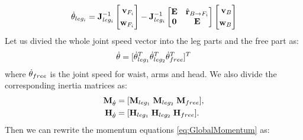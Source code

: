 \begin{equation}
\dot{\bf \theta}_{leg_i} = {\bf J}^{-1}_{leg_i}
\left[
\begin{aligned}
{\bf v}_{F_i} \\
{\bf w}_{F_i} \\
\end{aligned}
\right]
-
{\bf J}^{-1}_{leg_i}
\left[
\begin{matrix}
{\bf E} & \hat{\bf r}_{B \rightarrow F_i} \\
{\bf 0} & {\bf E}\\
\end{matrix}
\right]
\left[
\begin{aligned}
{\bf v}_{B} \\
{\bf w}_{B} \\
\end{aligned}
\right]
\label{eq:ThetaLeg}
\end{equation}
Let us divied the whole joint speed vector into the leg parts and the free part as:
\begin{equation}
\dot{\bf \theta} = [ \dot{\bf \theta}^T_{leg_1} \dot{\bf \theta}^T_{leg_2}
  \dot{\bf \theta}^T_{free} ]^T
\end{equation}
where $\dot{\bf \theta}_{free}$ is the joint speed for waist, arms and head.
We also divide the corresponding inertia matrices as:
\begin{equation}
\begin{aligned}
{\bf M}_{\dot{\theta}} &= [ {\bf M}_{leg_1} \; {\bf M}_{leg_2} \; {\bf M}_{free} ], \\
{\bf H}_{\dot{\theta}} &= [ {\bf H}_{leg_1} \; {\bf H}_{leg_2} \; {\bf H}_{free} ]. \\
\end{aligned}
\end{equation}
Then we can rewrite the momentum equations \ref{eq:GlobalMomentum} as:
